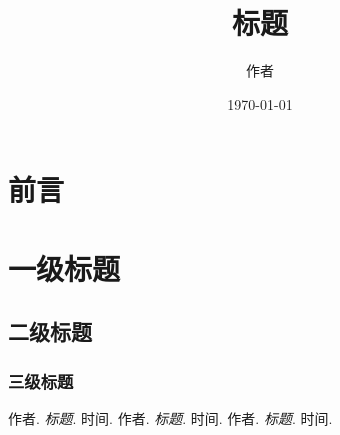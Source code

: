 \documentclass[12pt, a4paper, oneside]{ctexart}
\title{\textbf{标题}}
\author{作者}
\date{\today}
\begin{document}
\maketitle

\setcounter{page}{0}
\maketitle
\thispagestyle{empty}

\setcounter{page}{1}
\tableofcontents

\newpage
\setcounter{page}{1}

\section{前言}


\section{一级标题}

\subsection{二级标题}

\subsubsection{三级标题}



\newpage
\begin{thebibliography}{99}
    作者. \emph{标题}. 时间.
    作者. \emph{标题}. 时间.
    作者. \emph{标题}. 时间.
\end{thebibliography}
\end{document}
